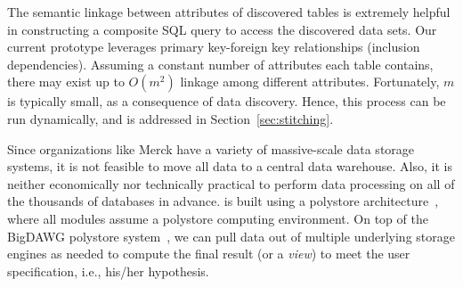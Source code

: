 The semantic linkage between attributes of discovered tables is extremely helpful in constructing a composite \textsf{SQL} query to access the discovered data sets. 
%
Our current prototype leverages primary key-foreign key relationships (inclusion dependencies).
Assuming a constant number of attributes each table contains, there may exist up to $O(m^2)$ linkage among different attributes.
%
Fortunately, $m$ is typically small, as a consequence of data discovery.
Hence, this process can be run dynamically, and is addressed in Section~\ref{sec:stitching}.



Since organizations like Merck have a variety of massive-scale data storage systems, it is not feasible to move all data to a central data warehouse. Also, it is neither economically nor technically practical to perform data processing on all of the thousands of databases in advance. 
\dcv is built using a polystore architecture~\cite{DBLP:journals/sigmod/DugganESBHKMMMZ15}, where all modules assume a polystore computing environment.
On top of the BigDAWG polystore system~\cite{DBLP:journals/pvldb/ElmoreDSBCGHHKK15}, we can pull data out of multiple underlying storage engines as needed to compute the final result (or a {\em view}) to meet the user specification, i.e., his/her hypothesis. 



